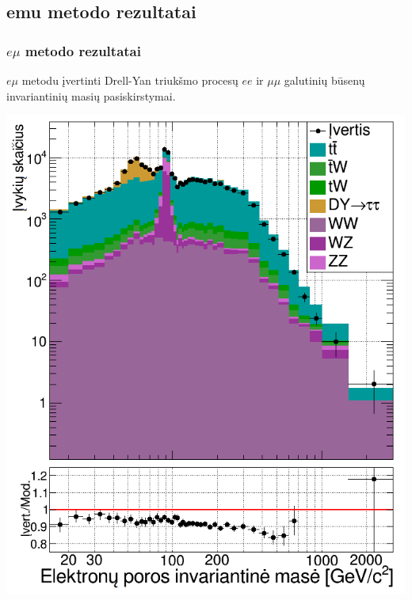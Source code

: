 \documentclass[xcolor=dvipsnames]{beamer}
\newcommand{\emu}{\mathit{e}\mu}
\newcommand{\ee}{\mathit{ee}}
\newcommand{\mumu}{\mu\mu}
\begin{document}
\begin{frame}
	\section{emu metodo rezultatai}
	\frametitle{$\emu$ metodo rezultatai}
	$\emu$ metodu įvertinti Drell-Yan triukšmo procesų $\ee$ ir $\mumu$ galutinių būsenų invariantinių masių pasiskirstymai.
	
	\begin{minipage}{0.46\textwidth}
		\includegraphics[width=\linewidth]{eeMassEst_SMALL.png}
	\end{minipage}
	\hfill
	\begin{minipage}{0.46\textwidth}

\end{minipage}
\end{frame}
\end{document}
